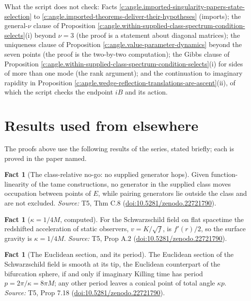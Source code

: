 \documentclass[11pt]{article}
\theoremstyle{definition}
\newtheorem{fact}[theorem]{Fact}
\theoremstyle{plain}
\begin{document}
What the script does not check: Facts \ref{c:angle.imported-singularity-papers-state-selection} to \ref{c:angle.imported-theorems-deliver-their-hypotheses} (imports); the general-$\nu$ clause of Proposition \ref{c:angle.within-supplied-class-spectrum-condition-selects}(i) beyond $\nu = 3$ (the proof is a statement about diagonal matrices); the uniqueness clause of Proposition \ref{c:angle.value-parameter-dynamics} beyond the seven points (the proof is the two-by-two computation); the Gibbs clause of Proposition \ref{c:angle.within-supplied-class-spectrum-condition-selects}(i) for sides of more than one mode (the rank argument); and the continuation to imaginary rapidity in Proposition \ref{c:angle.wedge-reflection-translations-are-ascent}(ii), of which the script checks the endpoint $iB$ and its action.

\section{Results used from elsewhere}
The proofs above use the following results of the series, stated briefly; each is proved in the paper named.

\begin{fact}[The class-relative no-go: no supplied generator hops]\label{c:singularity.class-relative-no-go-no-supplied}
Given function-linearity of the tame constructions, no generator in the supplied class moves occupation between points of $E$, while pairing generators lie outside the class and are not excluded.
\emph{Source:} T5, Thm C.8 (\href{https://doi.org/10.5281/zenodo.22721790}{doi:10.5281/zenodo.22721790}).
\end{fact}

\begin{fact}[$\kappa = 1/4M$, computed]\label{c:singularity.computed}
For the Schwarzschild field on flat spacetime the redshifted acceleration of static observers, $v = K/\sqrt f$, is $f'(r)/2$, so the surface gravity is $\kappa = 1/4M$.
\emph{Source:} T5, Prop A.2 (\href{https://doi.org/10.5281/zenodo.22721790}{doi:10.5281/zenodo.22721790}).
\end{fact}

\begin{fact}[The Euclidean section, and its period]\label{c:singularity.euclidean-section-period}
The Euclidean section of the Schwarzschild field is smooth at its tip, the Euclidean counterpart of the bifurcation sphere, if and only if imaginary Killing time has period $p = 2\pi/\kappa = 8\pi M$; any other period leaves a conical point of total angle $\kappa p$.
\emph{Source:} T5, Prop 7.18 (\href{https://doi.org/10.5281/zenodo.22721790}{doi:10.5281/zenodo.22721790}).
\end{fact}
\end{document}
